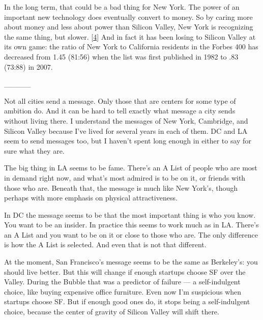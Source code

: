 In the long term, that could be a bad thing
                  for New York. The power of an important new technology does
                  eventually convert to money. So by caring more about money and
                  less about power than Silicon Valley, New York is recognizing
                  the same thing, but slower.
                  [\href{\#f4n}{4}]
                  And in fact it has been losing to Silicon Valley at its own
                  game: the ratio of New York to California residents in the
                  Forbes 400 has decreased from 1.45 (81:56) when the list was
                  first published in 1982 to .83 (73:88) in 2007.


                  \_\_\_\_\_
                  

Not all cities send a message. Only those that are
                  centers for some type of ambition do. And it can be hard to
                  tell exactly what message a city sends without living there. I
                  understand the messages of New York, Cambridge, and Silicon
                  Valley because I've lived for several years in each of them.
                  DC and LA seem to send messages too, but I haven't spent long
                  enough in either to say for sure what they are.

The
                  big thing in LA seems to be fame. There's an A List of people
                  who are most in demand right now, and what's most admired is
                  to be on it, or friends with those who are. Beneath that, the
                  message is much like New York's, though perhaps with more
                  emphasis on physical attractiveness.

In DC the
                  message seems to be that the most important thing is who you
                  know. You want to be an insider. In practice this seems to
                  work much as in LA. There's an A List and you want to be on it
                  or close to those who are. The only difference is how the A
                  List is selected. And even that is not that different.

At
                  the moment, San Francisco's message seems to be the same as
                  Berkeley's: you should live better. But this will change if
                  enough startups choose SF over the Valley. During the Bubble
                  that was a predictor of failure --- a self-indulgent
                  choice, like buying expensive office furniture. Even now I'm
                  suspicious when startups choose SF. But if enough good ones
                  do, it stops being a self-indulgent choice, because the center
                  of gravity of Silicon Valley will shift there.

